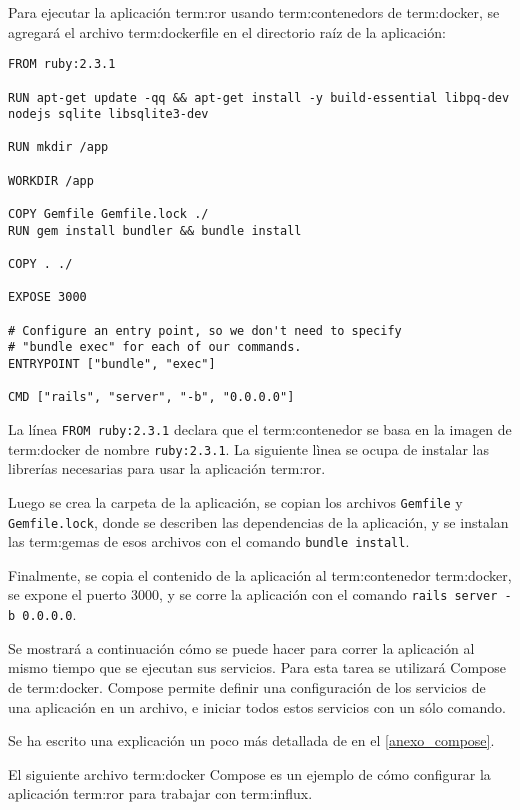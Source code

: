 Para ejecutar la aplicación \gls{term:ror} usando \glspl{term:contenedor} de
\gls{term:docker}, se agregará el archivo \gls{term:dockerfile} en el directorio
raíz de la aplicación:

\begin{lstlisting}
FROM ruby:2.3.1

RUN apt-get update -qq && apt-get install -y build-essential libpq-dev nodejs sqlite libsqlite3-dev

RUN mkdir /app

WORKDIR /app

COPY Gemfile Gemfile.lock ./
RUN gem install bundler && bundle install

COPY . ./

EXPOSE 3000

# Configure an entry point, so we don't need to specify 
# "bundle exec" for each of our commands.
ENTRYPOINT ["bundle", "exec"]

CMD ["rails", "server", "-b", "0.0.0.0"]
\end{lstlisting}

La línea \lstinline{FROM ruby:2.3.1} declara que el \gls{term:contenedor} se
basa en la imagen de \gls{term:docker} de nombre \lstinline{ruby:2.3.1}. La
siguiente lìnea se ocupa de instalar las librerías necesarias para usar la
aplicación \gls{term:ror}.

Luego se crea la carpeta de la aplicación, se copian los archivos
\lstinline{Gemfile} y \lstinline{Gemfile.lock}, donde se describen las
dependencias de la aplicación, y se instalan las \glspl{term:gema} de esos
archivos con el comando \lstinline{bundle install}.

Finalmente, se copia el contenido de la aplicación al \gls{term:contenedor}
\gls{term:docker}, se expone el puerto 3000, y se corre la aplicación con el
comando \lstinline{rails server -b 0.0.0.0}.

Se mostrará a continuación cómo se puede hacer para correr la aplicación al
mismo tiempo que se ejecutan sus servicios. Para esta tarea se utilizará Compose
de \gls{term:docker}. Compose permite definir una configuración de los
servicios de una aplicación en un archivo, e iniciar todos estos servicios con
un sólo comando.

Se ha escrito una explicación un poco más detallada de  en el
\autoref{anexo_compose}.

El siguiente archivo \gls{term:docker} Compose es un ejemplo de cómo configurar
la aplicación \gls{term:ror} para trabajar con \gls{term:influx}.

